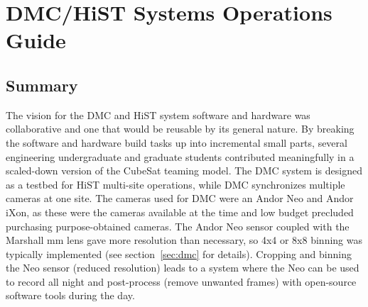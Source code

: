 \chapter{DMC/HiST Systems Operations Guide}
\label{chapter:ops}
\thispagestyle{myheadings}

\graphicspath{{Ops/}}

\section{Summary}
The vision for the DMC and HiST system software and hardware was collaborative and one that would be reusable by its general nature.
By breaking the software and hardware build tasks up into incremental small parts, several engineering undergraduate and graduate students contributed meaningfully in a scaled-down version of the CubeSat teaming model. 
The DMC system is designed as a testbed for HiST multi-site operations, while DMC synchronizes multiple cameras at one site.
The cameras used for DMC were an Andor Neo and Andor iXon, as these were the cameras available at the time and low budget precluded purchasing purpose-obtained cameras.
The Andor Neo sensor coupled with the Marshall \unit[140]{mm} lens gave more resolution than necessary, so 4x4 or 8x8 binning was typically implemented (see section~\ref{sec:dmc} for details).
Cropping and binning the Neo sensor (reduced resolution) leads to a system where the Neo can be used to record all night and post-process (remove unwanted frames) with open-source software tools during the day. 


